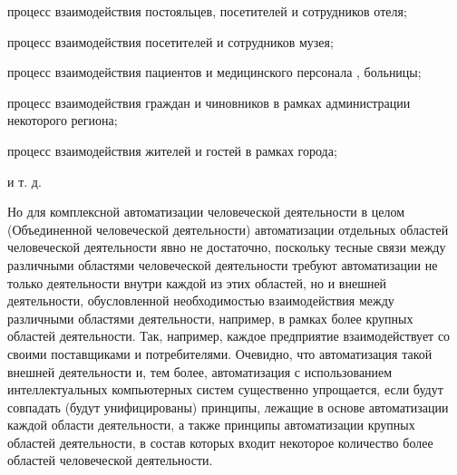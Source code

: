 {\begin{scnitemize}
    \item процесс взаимодействия постояльцев, посетителей и сотрудников  отеля;
    \item процесс взаимодействия посетителей и сотрудников  музея;
    \item процесс взаимодействия пациентов и медицинского персонала ,  больницы;
    \item процесс взаимодействия граждан и чиновников в рамках  администрации некоторого региона;
    \item процесс взаимодействия жителей и гостей в рамках  города;
    \item и т. д.
\end{scnitemize}
Но для комплексной автоматизации человеческой деятельности в целом (Объединенной человеческой деятельности) автоматизации отдельных областей человеческой деятельности явно не достаточно, поскольку тесные связи между различными областями человеческой деятельности требуют автоматизации не только деятельности внутри каждой из этих областей, но и внешней деятельности, обусловленной необходимостью взаимодействия между различными областями деятельности, например, в рамках более крупных областей деятельности. Так, например, каждое предприятие взаимодействует со своими поставщиками и потребителями. Очевидно, что автоматизация такой внешней деятельности и, тем более, автоматизация с использованием интеллектуальных компьютерных систем существенно упрощается, если будут совпадать (будут унифицированы) принципы, лежащие в основе автоматизации каждой области деятельности, а также принципы автоматизации крупных областей деятельности, в состав которых входит некоторое количество более  областей человеческой деятельности.

}
